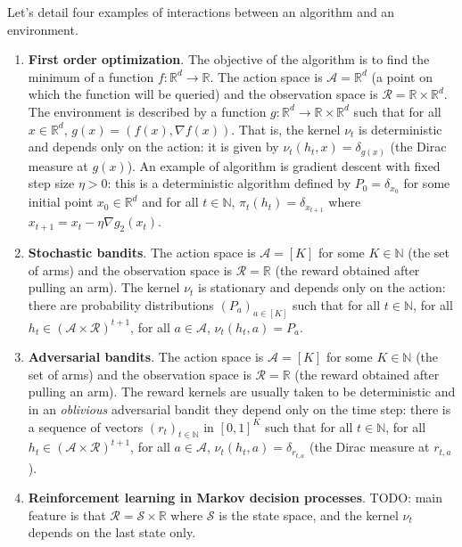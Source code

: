Let's detail four examples of interactions between an algorithm and an environment.
\begin{enumerate}
  \item \textbf{First order optimization}. The objective of the algorithm is to find the minimum of a function $f : \mathbb{R}^d \to \mathbb{R}$.
  The action space is $\mathcal{A} = \mathbb{R}^d$ (a point on which the function will be queried) and the observation space is $\mathcal{R} = \mathbb{R} \times \mathbb{R}^d$.
  The environment is described by a function $g : \mathbb{R}^d \to \mathbb{R} \times \mathbb{R}^d$ such that for all $x \in \mathbb{R}^d$, $g(x) = (f(x), \nabla f(x))$. That is, the kernel $\nu_t$ is deterministic and depends only on the action: it is given by $\nu_t(h_t, x) = \delta_{g(x)}$ (the Dirac measure at $g(x)$).
  An example of algorithm is gradient descent with fixed step size $\eta > 0$: this is a deterministic algorithm defined by $P_0 = \delta_{x_0}$ for some initial point $x_0 \in \mathbb{R}^d$ and for all $t \in \mathbb{N}$, $\pi_t(h_t) = \delta_{x_{t+1}}$ where $x_{t+1} = x_t - \eta \nabla g_2(x_t)$.

  \item \textbf{Stochastic bandits}. The action space is $\mathcal{A} = [K]$ for some $K \in \mathbb{N}$ (the set of arms) and the observation space is $\mathcal{R} = \mathbb{R}$ (the reward obtained after pulling an arm).
  The kernel $\nu_t$ is stationary and depends only on the action: there are probability distributions $(P_a)_{a \in [K]}$ such that for all $t \in \mathbb{N}$, for all $h_t \in (\mathcal{A} \times \mathcal{R})^{t+1}$, for all $a \in \mathcal{A}$, $\nu_t(h_t, a) = P_a$.

  \item \textbf{Adversarial bandits}. The action space is $\mathcal{A} = [K]$ for some $K \in \mathbb{N}$ (the set of arms) and the observation space is $\mathcal{R} = \mathbb{R}$ (the reward obtained after pulling an arm).
  The reward kernels are usually taken to be deterministic and in an \emph{oblivious} adversarial bandit they depend only on the time step: there is a sequence of vectors $(r_t)_{t \in \mathbb{N}}$ in $[0,1]^K$ such that for all $t \in \mathbb{N}$, for all $h_t \in (\mathcal{A} \times \mathcal{R})^{t+1}$, for all $a \in \mathcal{A}$, $\nu_t(h_t, a) = \delta_{r_{t,a}}$ (the Dirac measure at $r_{t,a}$).

  \item \textbf{Reinforcement learning in Markov decision processes}.
  TODO: main feature is that $\mathcal{R} = \mathcal{S} \times \mathbb{R}$ where $\mathcal{S}$ is the state space, and the kernel $\nu_t$ depends on the last state only.
\end{enumerate}


